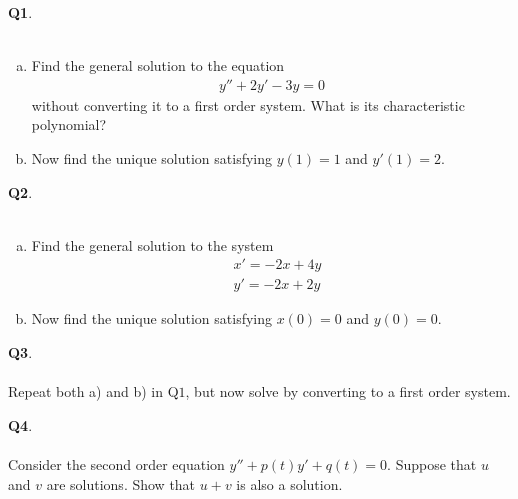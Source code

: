 \documentclass[12pt, oneside]{amsart}
\begin{document}
\vfill


\newpage
\noindent
\textbf{Q1}. \\ \\ 
\begin{enumerate}[a)]
    \item
Find the general solution to the equation
\begin{equation*}
\begin{split}
y'' + 2y' - 3y =0
\end{split}
\end{equation*}
without converting it to a first order system. What is its characteristic polynomial?


\vspace{5in}
\item
    Now find the unique solution satisfying $y(1) = 1$ and $y'(1) = 2$.
\end{enumerate}

\newpage
\noindent
\textbf{Q2}. \\ \\ 
\begin{enumerate}[a)]
    \item
Find the general solution to the system
\begin{equation*}
\begin{split}
& x' = -2x + 4y
\\
& y' = -2x+ 2y 
\end{split}
\end{equation*}



\vspace{5in}
\item
    Now find the unique solution satisfying $x(0) = 0$ and $y(0) = 0$. 
\end{enumerate}

\newpage
\noindent
\textbf{Q3}. \\ \\ 
Repeat both a) and b) in Q$1$, but now solve by converting to a first order system.
        \newpage

\noindent
\textbf{Q4}. \\ \\ 
Consider the second order equation $y'' + p(t)y' + q(t) = 0$. Suppose that $u$
and $v$ are solutions. Show that $u + v$ is also a solution.
\end{document}
